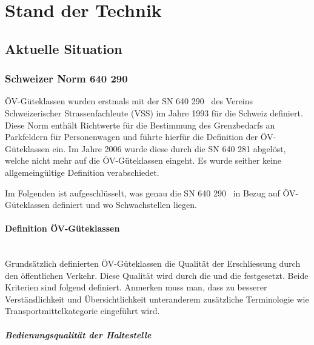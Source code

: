 
\section{Stand der Technik}
\label{Stand der Technik}

\subsection{Aktuelle Situation}
\label{Stand der Technik:Aktuelle Situation}

\subsubsection{Schweizer Norm 640 290}
\label{Aktuelle Situation:Schweizer Norm 640 290}

\acs{ÖV}-Güteklassen wurden erstmals mit der \ac{SN} 640 290~\cite{sn640290} des Vereins Schweizerischer Strassenfachleute (VSS) im Jahre 1993 für die Schweiz definiert.
Diese Norm enthält Richtwerte für die Bestimmung des Grenzbedarfs an Parkfeldern für Personenwagen und führte hierfür die Definition der \acs{ÖV}-Güteklassen ein.
Im Jahre 2006 wurde diese durch die \acs{SN} 640 281 abgelöst, welche nicht mehr auf die \acs{ÖV}-Güteklassen eingeht.
Es wurde seither keine allgemeingültige Definition verabschiedet.

Im Folgenden ist aufgeschlüsselt, was genau die \acs{SN} 640 290~\cite{sn640290} in Bezug auf \acs{ÖV}-Güteklassen definiert und wo Schwachstellen liegen.

\paragraph{Definition ÖV-Güteklassen}~\\

Grundsätzlich definierten \acs{ÖV}-Güteklassen die Qualität der Erschliessung durch den öffentlichen Verkehr.
Diese Qualität wird durch die  und die  festgesetzt.
Beide Kriterien sind folgend definiert.
Anmerken muss man, dass zu besserer Verständlichkeit und Übersichtlichkeit unteranderem zusätzliche Terminologie wie Transportmittelkategorie eingeführt wird.

\subparagraph{Bedienungsqualität der Haltestelle}~\\
\label{Definition ÖV-Güteklassen:Bedienungsqualität der Haltestelle}

